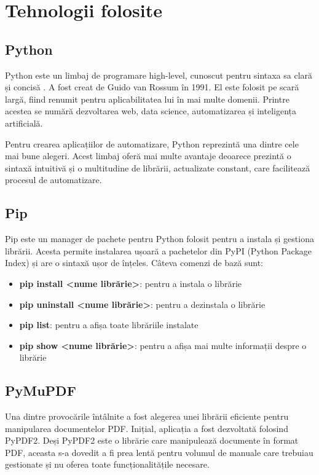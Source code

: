 \chapter{Tehnologii folosite}
\section{Python}

Python este un limbaj de programare high-level, cunoscut pentru sintaxa sa clară și concisă \cite{van2006introduction}. A fost creat de Guido van Rossum în 1991. El este folosit pe scară largă, fiind renumit pentru aplicabilitatea lui în mai multe domenii. Printre acestea se numără dezvoltarea  web, data science, automatizarea și inteligența artificială.

Pentru crearea aplicațiilor de automatizare, Python reprezintă una dintre cele mai bune alegeri. Acest limbaj oferă mai multe avantaje deoarece prezintă o sintaxă intuitivă și o multitudine de librării, actualizate constant, care facilitează procesul de automatizare.


\section{Pip}

Pip este un manager de pachete pentru Python folosit pentru a instala și gestiona librării. Acesta permite instalarea ușoară a pachetelor din PyPI (Python Package Index) și are o sintaxă ușor de înțeles. Câteva comenzi de bază sunt:
\begin{itemize}
	\item \textbf{pip install <nume librărie>}: pentru a instala o librărie
	\item \textbf{pip uninstall <nume librărie>}: pentru a dezinstala o librărie
	\item \textbf{pip list}: pentru a afișa toate librăriile instalate
	\item \textbf{pip show <nume librărie>}: pentru a afișa mai multe informații despre o librărie
\end{itemize}


\section{PyMuPDF}

Una dintre provocările întâlnite a fost alegerea unei librării eficiente pentru manipularea documentelor PDF. Inițial, aplicația a fost dezvoltată folosind PyPDF2. Deși PyPDF2 este o librărie care manipulează documente în format PDF, aceasta s-a dovedit a fi prea lentă pentru volumul de manuale care trebuiau gestionate și nu oferea toate funcționalitățile necesare.

